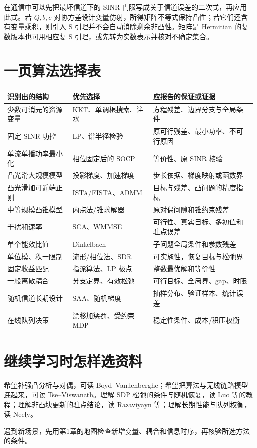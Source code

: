 在通信中可以先把最坏信道下的 SINR 门限写成关于信道误差的二次式，再应用此式。若 $Q,b,c$ 对协方差设计变量仿射，所得矩阵不等式保持凸性；若它们还含有变量乘积，则引入 S 引理并不会自动消除剩余非凸性。矩阵是 Hermitian 的复数版本也可用相应复 S 引理，或先转为实数表示并核对不确定集合。

\section{一页算法选择表}
\begingroup\small
\begin{longtable}{p{}p{}p{}}
\toprule 识别出的结构 & 优先选择 & 应报告的保证或证据\\\midrule\endhead
少数可消元的资源变量 & KKT、单调根搜索、注水 & 方程残差、边界分支与全局条件\\
固定 SINR 功控 & LP、谱半径检验 & 原可行残差、最小功率、不可行原因\\
单流单播功率最小化 & 相位固定后的 SOCP & 等价性、原 SINR 核验\\
凸光滑大规模模型 & 投影梯度、加速梯度 & 步长依据、梯度映射或函数界\\
凸光滑加可近端正则 & ISTA/FISTA、ADMM & 目标与残差、凸问题的精度指标\\
中等规模凸锥模型 & 内点法/锥求解器 & 原对偶间隙和锥约束残差\\
干扰和速率 & SCA、WMMSE & 可行性、真实目标、多初值和驻点误差\\
单个能效比值 & Dinkelbach & 子问题全局条件和参数残差\\
单位模、秩一限制 & 流形/相位法、SDR & 可实施性，恢复目标与松弛界\\
固定收益匹配 & 指派算法、LP 极点 & 整数最优解和等价性\\
一般离散耦合 & 分支定界、有效松弛 & 可行目标、全局界、gap、时限\\
随机信道长期设计 & SAA、随机梯度 & 抽样分布、验证样本、统计误差\\
在线队列决策 & 漂移加惩罚、受约束 MDP & 稳定性条件、成本/积压权衡\\\bottomrule
\end{longtable}
\endgroup

\section{继续学习时怎样选资料}
希望补强凸分析与对偶，可读 Boyd--Vandenberghe\cite{boyd2004}；希望把算法与无线链路模型连起来，可读 Tse--Viswanath\cite{tse2005}。理解 SDP 松弛的条件与随机恢复，读 Luo 等的教程\cite{luo2010}；理解非凸块更新的驻点结论，读 Razaviyayn 等\cite{razaviyayn2013}；理解长期性能与队列权衡，读 Neely\cite{neely2010}。

遇到新场景，先用第1章的地图检查新增变量、耦合和信息时序，再核验所选方法的条件。

